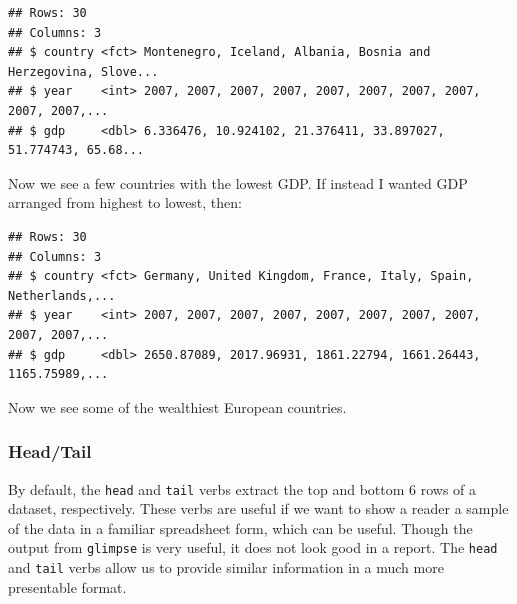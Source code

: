 \documentclass[
]{book}
\newenvironment{Shaded}{\begin{snugshade}}{\end{snugshade}}
\newcommand{\KeywordTok}[1]{\textcolor[rgb]{0.13,0.29,0.53}{\textbf{#1}}}
\newcommand{\NormalTok}[1]{#1}
\newcommand{\OperatorTok}[1]{\textcolor[rgb]{0.81,0.36,0.00}{\textbf{#1}}}
\newcommand{\StringTok}[1]{\textcolor[rgb]{0.31,0.60,0.02}{#1}}
\begin{document}
\begin{Shaded}
\end{Shaded}

\begin{verbatim}
## Rows: 30
## Columns: 3
## $ country <fct> Montenegro, Iceland, Albania, Bosnia and Herzegovina, Slove...
## $ year    <int> 2007, 2007, 2007, 2007, 2007, 2007, 2007, 2007, 2007, 2007,...
## $ gdp     <dbl> 6.336476, 10.924102, 21.376411, 33.897027, 51.774743, 65.68...
\end{verbatim}

Now we see a few countries with the lowest GDP. If instead I wanted GDP arranged from highest to lowest, then:

\begin{Shaded}
\end{Shaded}

\begin{verbatim}
## Rows: 30
## Columns: 3
## $ country <fct> Germany, United Kingdom, France, Italy, Spain, Netherlands,...
## $ year    <int> 2007, 2007, 2007, 2007, 2007, 2007, 2007, 2007, 2007, 2007,...
## $ gdp     <dbl> 2650.87089, 2017.96931, 1861.22794, 1661.26443, 1165.75989,...
\end{verbatim}

Now we see some of the wealthiest European countries.

\hypertarget{headtail}{%
\subsubsection*{Head/Tail}\label{headtail}}

By default, the \texttt{head} and \texttt{tail} verbs extract the top and bottom 6 rows of a dataset, respectively. These verbs are useful if we want to show a reader a sample of the data in a familiar spreadsheet form, which can be useful. Though the output from \texttt{glimpse} is very useful, it does not look good in a report. The \texttt{head} and \texttt{tail} verbs allow us to provide similar information in a much more presentable format.
\end{document}
